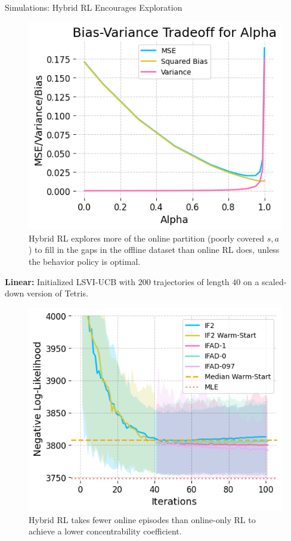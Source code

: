 \documentclass[final]{beamer}
\newlength{\colwidth}
\begin{document}
\begin{frame}[t]
\begin{columns}[t]
\begin{column}{\colwidth}
\begin{exampleblock}{Simulations: Hybrid RL Encourages Exploration}
\begin{figure}[H]
    \centering
    \includegraphics[scale=1]{imgs/095/biasvar.png}
    \caption{Hybrid RL explores more of the online partition (poorly covered $s,a$) to fill in the gaps in the offline dataset than online RL does, unless the behavior policy is optimal.
    }
\end{figure}

    \textbf{Linear:} Initialized LSVI-UCB \cite{jin2020provably} with $200$ trajectories of length $40$ on a scaled-down version of Tetris.

    \begin{figure}[H]
    \centering
    \includegraphics[scale=1]{imgs/095/optim.png}
    \caption{Hybrid RL takes fewer online episodes than online-only RL to achieve a lower concentrability coefficient.}
    \label{fig:linear-coverage}
\end{figure}



\end{exampleblock}
\end{column}
\end{columns}
\end{frame}
\end{document}
